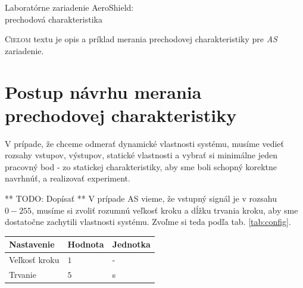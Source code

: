 \documentclass[a4paper, 10pt, ]{article}
\begin{document}
\begin{flushleft}
    Laboratórne zariadenie AeroShield:\\ prechodová charakteristika
\end{flushleft}

\bigskip

\normalsize
\normalfont

\lstset{style=mystyle}










\noindent
\lettrine[lines=1, nindent=1pt, loversize=0.0]{C}{ieľom}
textu je opis a príklad merania prechodovej charakteristiky pre \emph{AS} zariadenie.


\section{Postup návrhu merania prechodovej charakteristiky}
V prípade, že chceme odmerať dynamické vlastnosti systému, musíme vedieť rozsahy vstupov, výstupov, statické vlastnosti a vybrať si minimálne jeden pracovný bod - zo statickej charakteristiky, aby sme boli schopný korektne navrhnúť, a realizovať experiment.

** TODO: Dopísať **
V prípade AS vieme, že vstupný signál je v rozsahu $0 - 255$, musíme si zvoliť rozumnú veľkosť kroku a dĺžku trvania kroku, aby sme dostatočne zachytili vlastnosti systému. Zvoľme si teda podľa tab. \ref{tab:config}.

\begin{center}

    \vspace{-10pt}

    \label{tab:config}

    \lstyle

    \begin{tabular*}{\textwidth}{@{ \extracolsep{\fill}} lll}
        \toprule
        Nastavenie & Hodnota & Jednotka \\
        \midrule
        Veľkosť kroku & $1$ & - \\
        Trvanie & $5$ & s \\
        \bottomrule
    \end{tabular*}

\end{center}
\end{document}
